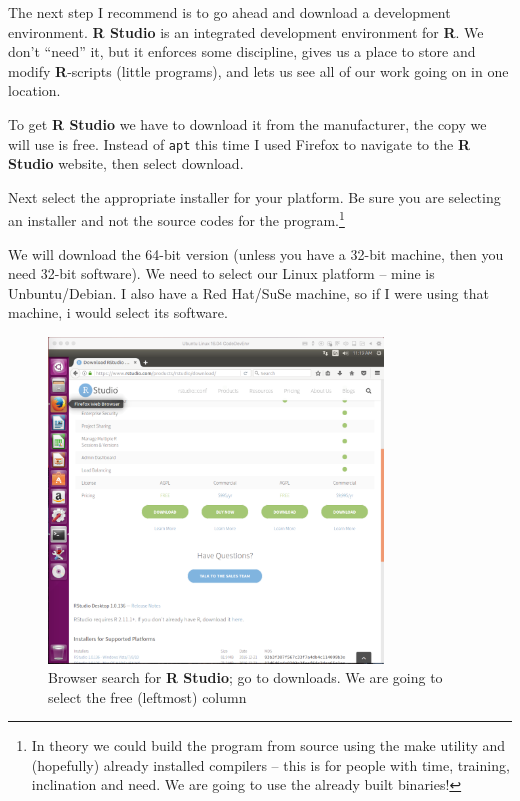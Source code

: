 The next step I recommend is to go ahead and download a development environment.
\textbf{R Studio} is an integrated development environment for \textbf{R}.   
We don't ``need'' it, but it enforces some discipline, gives us a place to store and modify \textbf{R}-scripts (little programs), and lets us see all of our work going on in one location.

To get \textbf{R Studio} we have to download it from the manufacturer, the copy we will use is free.  
Instead of \texttt{apt} this time I used Firefox to navigate to the \textbf{R Studio} website, then select download.

Next select the appropriate installer for your platform.
Be sure you are selecting an installer and not the source codes for the program.\footnote{In theory we could build the program from source using the make utility and (hopefully) already installed compilers -- this is for people with time, training, inclination and need.  We are going to use the already built binaries!}

We will download the 64-bit version (unless you have a 32-bit machine, then you need 32-bit software).
We need to select our Linux platform -- mine is Unbuntu/Debian.   
I also have a Red Hat/SuSe machine, so if I were using that machine, i would select its software.

\begin{figure}[h!] %
   \centering
   \includegraphics[width=3.5in]{./1-Introduction/LinuxRStudio.pdf} 
   \caption{Browser search for \textbf{R Studio}; go to downloads.  We are going to select the free (leftmost) column}
\end{figure}

